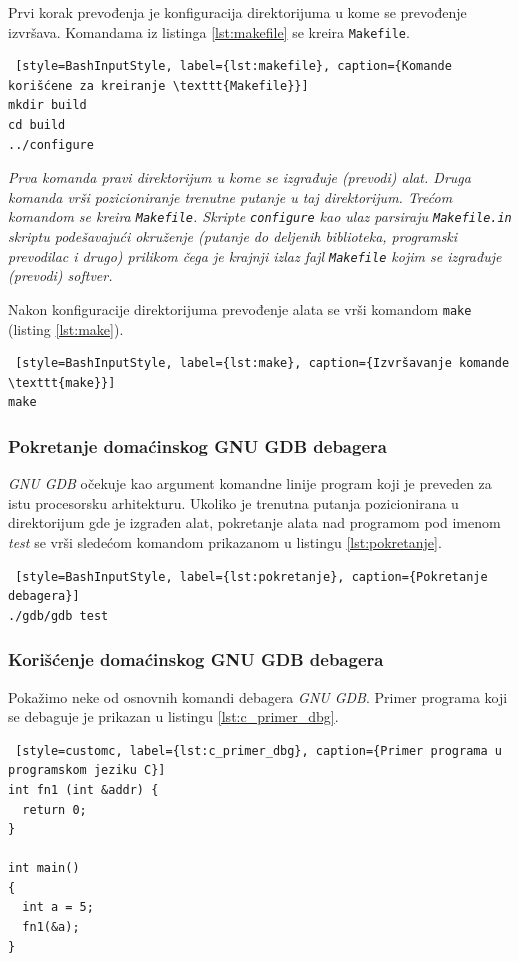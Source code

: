 \documentclass[12pt,oneside]{memoir}
\begin{document}
Prvi korak prevođenja je konfiguracija direktorijuma u kome se prevođenje izvršava. Komandama iz listinga \ref{lst:makefile} se kreira \texttt{Makefile}.
\begin{lstlisting} [style=BashInputStyle, label={lst:makefile}, caption={Komande korišćene za kreiranje \texttt{Makefile}}]
mkdir build
cd build
../configure

\end{lstlisting}
\emph{Prva komanda pravi direktorijum u kome se izgrađuje (prevodi) alat. Druga komanda vrši pozicioniranje trenutne putanje u taj direktorijum. Trećom komandom se kreira \texttt{Makefile}. Skripte \texttt{configure} kao ulaz parsiraju \texttt{Makefile.in} skriptu podešavajući okruženje (putanje do deljenih biblioteka, programski prevodilac i drugo) prilikom čega je krajnji izlaz fajl \texttt{Makefile} kojim se izgrađuje (prevodi) softver.}

Nakon konfiguracije direktorijuma prevođenje alata se vrši komandom \texttt{make} (listing \ref{lst:make}).
\begin{lstlisting} [style=BashInputStyle, label={lst:make}, caption={Izvršavanje komande \texttt{make}}]
make
\end{lstlisting}

\subsubsection{Pokretanje domaćinskog GNU GDB debagera}

\emph{GNU GDB} očekuje kao argument komandne linije program koji je preveden za istu procesorsku arhitekturu. Ukoliko je trenutna putanja pozicionirana u direktorijum gde je izgrađen alat, pokretanje alata nad programom pod imenom \emph{test} se vrši sledećom komandom prikazanom u listingu \ref{lst:pokretanje}.
\begin{lstlisting} [style=BashInputStyle, label={lst:pokretanje}, caption={Pokretanje debagera}]
./gdb/gdb test

\end{lstlisting}


\subsubsection{Korišćenje domaćinskog GNU GDB debagera}

Pokažimo neke od osnovnih komandi debagera \emph{GNU GDB}.
Primer programa koji se debaguje je prikazan u listingu \ref{lst:c_primer_dbg}.\newpage

\begin{lstlisting} [style=customc, label={lst:c_primer_dbg}, caption={Primer programa u programskom jeziku C}]
int fn1 (int &addr) {
  return 0;
}

int main()
{
  int a = 5;
  fn1(&a);
}
\end{lstlisting}
\end{document}

